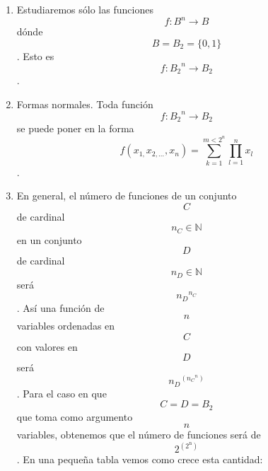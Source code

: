 \begin{enumerate}
\begin{enumerate}
    \begin{enumerate}
    \def\labelenumiii{\arabic{enumiii}.}
    \tightlist
    \item
      Estudiaremos sólo las funciones \[f:{B^{n}\rightarrow B}\] dónde
      \[{B = B_{2}} = {\{ 0,1\}}\]. Esto es
      \[f:{{B_{2}}^{n}\rightarrow B_{2}}\].
    \item
      Formas normales. Toda función \[f:{{B_{2}}^{n}\rightarrow B_{2}}\]
      se puede poner en la forma
      \[f{{({x_{1,}x_{2,...},x_{n}})} = {\sum\limits_{k = 1}^{m < 2^{n}}{\prod\limits_{l = 1}^{n}x_{l}}}}\].
    \item
      En general, el número de funciones de un conjunto \[C\]de cardinal
      \[n_{C} \in \mathbb{N}\] en un conjunto \[D\]de cardinal
      \[n_{D} \in \mathbb{N}\]será \[{n_{D}}^{n_{C}}\]. Así una función
      de \[n\] variables ordenadas en \[C\]con valores en \[D\]será
      \[{n_{D}}^{({n_{C}}^{n})}\]. Para el caso en que
      \[{C = D} = B_{2}\]que toma como argumento\[n\] variables,
      obtenemos que el número de funciones será de
      \[2^{(2^{\mathbf{\mathrm{n}}})}\]. En una pequeña tabla vemos como
      crece esta cantidad:
    \end{enumerate}
  \end{enumerate}
\end{enumerate}

